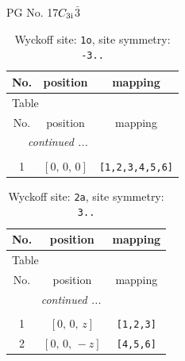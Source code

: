\documentclass[fleqn,8pt]{jsarticle}
\begin{document}
\setcounter{MaxMatrixCols}{32}

\renewcommand{\tablename}{Table~}
\renewcommand{\figurename}{Figure~}
\begin{center}
\LARGE
PG No. 17\quad$C_{\rm 3i}$\quad$\bar{3}$\quad[ trigonal ]
\end{center}
\renewcommand{\arraystretch}{1.2}
\begin{longtable}{ccc}
\caption{Wyckoff site: {\tt 1o}, site symmetry: {\tt -3..}}
 \\
 \hline \hline
No. & position & mapping \\ \hline \endfirsthead

\multicolumn{2}{l}{\tablename\ \thetable{}} \\
 \hline \hline
No. & position & mapping \\ \hline \endhead

 \hline \hline
\multicolumn{2}{r}{\footnotesize\it continued ...} \\ \endfoot

 \hline \hline
\multicolumn{2}{r}{} \\ \endlastfoot

1 & $\left[ 0,\, 0,\, 0 \right]$ & {\tt [1,2,3,4,5,6]} \\
\end{longtable}
\renewcommand{\arraystretch}{1.2}
\begin{longtable}{ccc}
\caption{Wyckoff site: {\tt 2a}, site symmetry: {\tt 3..}}
 \\
 \hline \hline
No. & position & mapping \\ \hline \endfirsthead

\multicolumn{2}{l}{\tablename\ \thetable{}} \\
 \hline \hline
No. & position & mapping \\ \hline \endhead

 \hline \hline
\multicolumn{2}{r}{\footnotesize\it continued ...} \\ \endfoot

 \hline \hline
\multicolumn{2}{r}{} \\ \endlastfoot

1 & $\left[ 0,\, 0,\, z \right]$ & {\tt [1,2,3]} \\ \hline
2 & $\left[ 0,\, 0,\, - z \right]$ & {\tt [4,5,6]} \\
\end{longtable}
\renewcommand{\arraystretch}{1.2}
\end{document}
